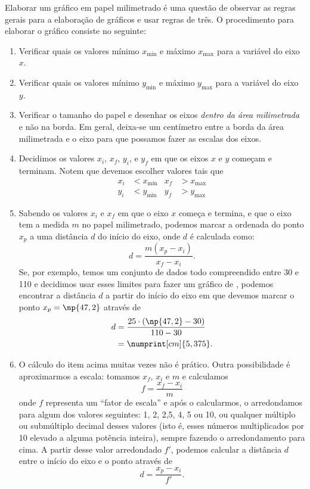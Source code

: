 Elaborar um gráfico em papel milimetrado é uma questão de observar as regras gerais para a elaboração de gráficos e usar regras de três. O procedimento para elaborar o gráfico consiste no seguinte:
\begin{enumerate}
	\item Verificar quais os valores mínimo $x_{\text{min}}$ e máximo $x_{\text{max}}$ para a variável do eixo $x$.
	\item Verificar quais os valores mínimo $y_{\text{min}}$ e máximo $y_{\text{max}}$ para a variável do eixo $y$.
	\item Verificar o tamanho do papel e desenhar os eixos \emph{dentro da área milimetrada} e não na borda. Em geral, deixa-se um centímetro entre a borda da área milimetrada e o eixo para que possamos fazer as escalas dos eixos.
	\item Decidimos os valores $x_i$, $x_f$, $y_i$, e $y_f$ em que os eixos $x$ e $y$ começam e terminam. Notem que devemos escolher valores tais que
	\begin{align}
	    x_i &< x_{\text{min}} & x_f &> x_{\text{max}} \\
	    y_i &< y_{\text{min}} & y_f &> y_{\text{max}}
	\end{align}
	\item Sabendo os valores $x_i$ e $x_f$ em que o eixo $x$ começa e termina, e que o eixo tem a medida $m$ no papel milimetrado, podemos marcar a ordenada do ponto $x_p$ a uma distância $d$ do início do eixo, onde $d$ é calculada como:
	\begin{equation}
		d = \frac{m(x_p-x_i)}{x_f-x_i}.
	\end{equation}
	Se, por exemplo, temos um conjunto de dados todo compreendido entre 30 e 110 e decidimos usar esses limites para fazer um gráfico de , podemos encontrar a distância $d$ a partir do início do eixo em que devemos marcar o ponto $x_p=\np{47,2}$ através de
	\begin{align}
		d &= \frac{25\cdot(\np{47,2} - 30)}{110 - 30} \\
		  &= \numprint[cm]{5,375}.
	\end{align}
	\item O cálculo do item acima muitas vezes não é prático. Outra possibilidade é aproximarmos a escala: tomamos $x_f$, $x_i$ e $m$ e calculamos
		\begin{equation}
			f = \frac{x_f - x_i}{m}
		\end{equation}
		onde $f$ representa um ``fator de escala'' e após o calcularmos, o arredondamos para algum dos valores seguintes: 1, 2, 2,5, 4, 5 ou 10, ou qualquer múltiplo ou submúltiplo decimal desses valores (isto é, esses números multiplicados por 10 elevado a alguma potência inteira), sempre fazendo o arredondamento para cima. A partir desse valor arredondado $f'$, podemos calcular a distância $d$ entre o início do eixo e o ponto através de
		\begin{equation}
			d = \frac{x_p - x_i}{f'}.
		\end{equation}
\end{enumerate}

